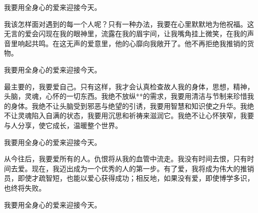 \documentclass[UTF8,a5paper]{ctexart}
\begin{document}
我要用全身心的爱来迎接今天。

我该怎样面对遇到的每一个人呢？只有一种办法，我要在心里默默地为他祝福。这无言的爱会闪现在我的眼神里，流露在我的眉宇间，让我嘴角挂上微笑，在我的声音里响起共鸣。在这无声的爱意里，他的心靡向我敞开了。他不再拒绝我推销的货物。

我要用全身心的爱来迎接今天。

最主要的，我要爱自己。只有这样，我才会认真检查故人我的身体，思想，精神，头脑，灵魂，心怀的一切东西。我绝不放纵**的需求，我要用清洁与节制来珍惜我的身体。我绝不让头脑受到邪恶与绝望的引诱，我要用智慧和知识使之升华。我绝不让灵魂陷入自满的状态，我要用沉思和祈祷来滋润它。我绝不让心怀狭窄，我要与人分享，使它成长，温暖整个世界。

我要用全身心的爱来迎接今天。

从今往后，我要爱所有的人。仇恨将从我的血管中流走。我没有时间去恨，只有时间去爱。现在，我迈出成为一个优秀的人的第一步。有了爱，我将成为伟大的推销员，即使才疏智短，也能以爱心获得成功；相反地，如果没有爱，即使博学多识，也终将失败。

我要用全身心的爱来迎接今天。
\end{document}
